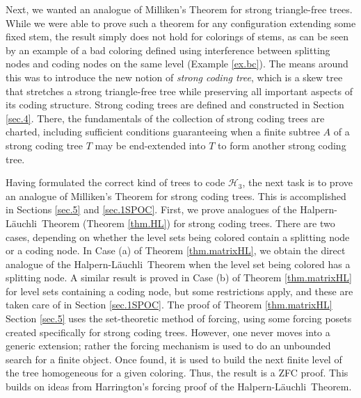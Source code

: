 \documentclass{amsart}
\theoremstyle{remark}
\theoremstyle{definition}
\theoremstyle{remark}
\newcommand{\Lauchli}{L{\"{a}}uchli}
\begin{document}
Next,
we wanted  an analogue of Milliken's Theorem for strong triangle-free trees.
While  we were able to prove
such a theorem
 for any  configuration extending some fixed stem,
the result simply does not hold  for colorings of stems, as  can be
seen by an example of a bad coloring defined using interference between splitting nodes and coding nodes on the same level  (Example \ref{ex.bc}).
The means around this  was to introduce the new notion of {\em  strong coding tree}, which  is a skew tree that stretches  a strong triangle-free tree while preserving all important aspects of its coding structure.
Strong coding trees are defined and constructed in Section \ref{sec.4}.
There, the fundamentals of the collection of strong coding trees are charted, including sufficient conditions
guaranteeing when a finite subtree $A$  of a strong coding tree $T$ may be end-extended into $T$ to form another strong coding tree.



Having formulated the correct kind of trees to code $\mathcal{H}_3$, the next task is to prove an analogue of Milliken's Theorem for strong coding trees.
This is accomplished in Sections \ref{sec.5} and  \ref{sec.1SPOC}.
First, we prove analogues of
 the Halpern-\Lauchli\ Theorem  (Theorem \ref{thm.HL})
 for strong coding trees.
There are two cases, depending on whether the level sets being colored contain a splitting node or a coding node.
In  Case (a) of
Theorem \ref{thm.matrixHL}, we obtain
the direct analogue of the Halpern-\Lauchli\ Theorem when the level set being colored has a splitting node.
A similar result is proved in Case (b) of Theorem \ref{thm.matrixHL} for level sets containing a coding node, but some restrictions apply, and these are   taken care of in Section \ref{sec.1SPOC}.
The proof of Theorem \ref{thm.matrixHL}
 Section  \ref{sec.5} uses the set-theoretic method of forcing, using some forcing posets created specifically for strong coding trees.
However, one never moves into a generic extension; rather the forcing mechanism is used to do an unbounded search for a finite object.
Once found, it is used to build the next finite level of the tree homogeneous for a given coloring.
Thus, the result is a ZFC proof.
This builds on
 ideas from Harrington's forcing proof of the Halpern-\Lauchli\ Theorem.
\end{document}
